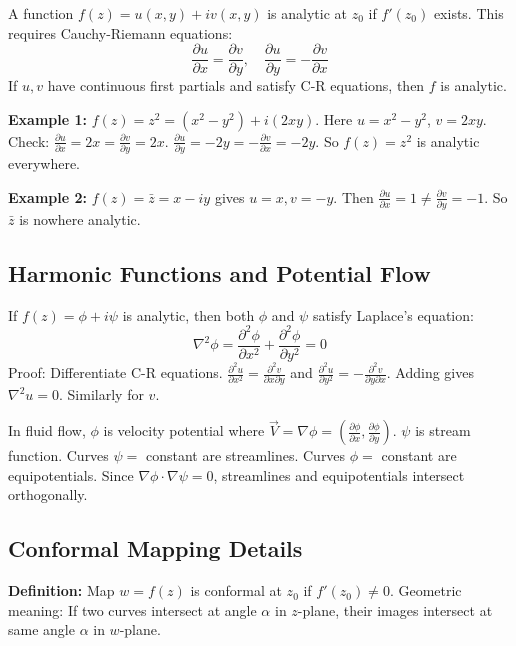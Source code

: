 \documentclass[12pt,a4paper]{article}
\begin{document}
A function $f(z) = u(x,y) + iv(x,y)$ is analytic at $z_0$ if $f'(z_0)$ exists. This requires Cauchy-Riemann equations:
\begin{equation}
\frac{\partial u}{\partial x} = \frac{\partial v}{\partial y}, \quad \frac{\partial u}{\partial y} = -\frac{\partial v}{\partial x}
\end{equation}
If $u,v$ have continuous first partials and satisfy C-R equations, then $f$ is analytic.

\textbf{Example 1:} $f(z) = z^2 = (x^2-y^2) + i(2xy)$. Here $u = x^2-y^2$, $v=2xy$. 
Check: $\frac{\partial u}{\partial x} = 2x = \frac{\partial v}{\partial y} = 2x$. $\frac{\partial u}{\partial y} = -2y = -\frac{\partial v}{\partial x} = -2y$. So $f(z)=z^2$ is analytic everywhere.

\textbf{Example 2:} $f(z) = \bar{z} = x-iy$ gives $u=x, v=-y$. Then $\frac{\partial u}{\partial x}=1 \neq \frac{\partial v}{\partial y} = -1$. So $\bar{z}$ is nowhere analytic.

\subsection{Harmonic Functions and Potential Flow}
If $f(z) = \phi + i\psi$ is analytic, then both $\phi$ and $\psi$ satisfy Laplace's equation:
\begin{equation}
\nabla^2 \phi = \frac{\partial^2 \phi}{\partial x^2} + \frac{\partial^2 \phi}{\partial y^2} = 0
\end{equation}
Proof: Differentiate C-R equations. $\frac{\partial^2 u}{\partial x^2} = \frac{\partial^2 v}{\partial x \partial y}$ and $\frac{\partial^2 u}{\partial y^2} = -\frac{\partial^2 v}{\partial y \partial x}$. Adding gives $\nabla^2 u = 0$. Similarly for $v$.

In fluid flow, $\phi$ is velocity potential where $\vec{V} = \nabla \phi = \left(\frac{\partial \phi}{\partial x}, \frac{\partial \phi}{\partial y}\right)$. $\psi$ is stream function. Curves $\psi =$ constant are streamlines. Curves $\phi =$ constant are equipotentials. Since $\nabla \phi \cdot \nabla \psi = 0$, streamlines and equipotentials intersect orthogonally.

\subsection{Conformal Mapping Details}
\textbf{Definition:} Map $w=f(z)$ is conformal at $z_0$ if $f'(z_0) \neq 0$. Geometric meaning: If two curves intersect at angle $\alpha$ in $z$-plane, their images intersect at same angle $\alpha$ in $w$-plane.
\end{document}
